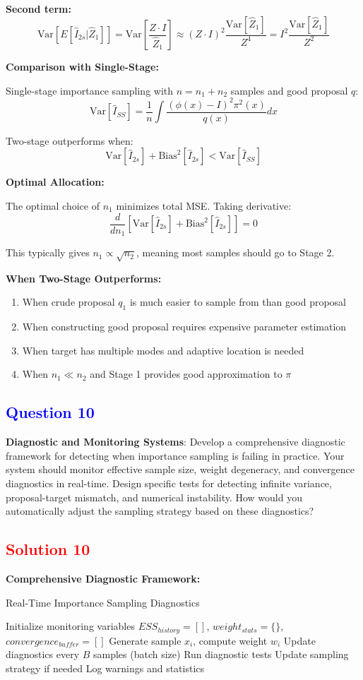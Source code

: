 \documentclass[11pt]{article}
\newcommand{\question}[1]{\subsection*{\textcolor{blue}{Question #1}}}
\newcommand{\solution}[1]{\subsection*{\textcolor{red}{Solution #1}}}
\begin{document}
\textbf{Second term:}
$$\text{Var}[E[\hat{I}_{2s}|\hat{Z}_1]] = \text{Var}\left[\frac{Z \cdot I}{\hat{Z}_1}\right] \approx (Z \cdot I)^2 \frac{\text{Var}[\hat{Z}_1]}{Z^4} = I^2 \frac{\text{Var}[\hat{Z}_1]}{Z^2}$$

\textbf{Comparison with Single-Stage:}

Single-stage importance sampling with $n = n_1 + n_2$ samples and good proposal $q$:
$$\text{Var}[\hat{I}_{SS}] = \frac{1}{n}\int \frac{(\phi(x) - I)^2\pi^2(x)}{q(x)}dx$$

Two-stage outperforms when:
$$\text{Var}[\hat{I}_{2s}] + \text{Bias}^2[\hat{I}_{2s}] < \text{Var}[\hat{I}_{SS}]$$

\textbf{Optimal Allocation:}

The optimal choice of $n_1$ minimizes total MSE. Taking derivative:
$$\frac{d}{dn_1}[\text{Var}[\hat{I}_{2s}] + \text{Bias}^2[\hat{I}_{2s}]] = 0$$

This typically gives $n_1 \propto \sqrt{n_2}$, meaning most samples should go to Stage 2.

\textbf{When Two-Stage Outperforms:}
\begin{enumerate}
\item When crude proposal $q_1$ is much easier to sample from than good proposal
\item When constructing good proposal requires expensive parameter estimation
\item When target has multiple modes and adaptive location is needed
\item When $n_1 \ll n_2$ and Stage 1 provides good approximation to $\pi$
\end{enumerate}

\question{10}
\textbf{Diagnostic and Monitoring Systems}: Develop a comprehensive diagnostic framework for detecting when importance sampling is failing in practice. Your system should monitor effective sample size, weight degeneracy, and convergence diagnostics in real-time. Design specific tests for detecting infinite variance, proposal-target mismatch, and numerical instability. How would you automatically adjust the sampling strategy based on these diagnostics?

\solution{10}
\textbf{Comprehensive Diagnostic Framework:}

\begin{algorithm}
\caption{Real-Time Importance Sampling Diagnostics}
\begin{algorithmic}[1]
\STATE Initialize monitoring variables
\STATE $ESS_{history} = []$, $weight_{stats} = \{\}$, $convergence_{buffer} = []$
    \STATE Generate sample $x_i$, compute weight $w_i$
    \STATE Update diagnostics every $B$ samples (batch size)
        \STATE Run diagnostic tests
        \STATE Update sampling strategy if needed
        \STATE Log warnings and statistics
    \ENDIF
\ENDWHILE
\end{algorithmic}
\end{algorithm}
\end{document}
